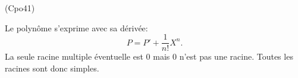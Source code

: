 \begin{tiny}(Cpo41)\end{tiny} Le polynôme s'exprime avec sa dérivée:
\[
  P = P' + \frac{1}{n!} X^n .
\]
La seule racine multiple éventuelle est $0$ mais $0$ n'est pas une racine. Toutes les racines sont donc simples.
